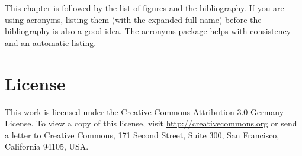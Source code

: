\documentclass[a4paper,twoside, openright,12pt]{report}
\begin{document}
This chapter is followed by the list of figures and the bibliography. If you are using acronyms, listing them (with the expanded full name) before the bibliography is also a good idea. The acronyms package helps with consistency and an automatic listing.




\cleardoublepage
{}
\listoffigures 	 %


\cleardoublepage
{}





\cleardoublepage
\chapter*{License}
This work is licensed under the Creative Commons Attribution 3.0 Germany
License. To view a copy of this license,
visit \href{http://creativecommons.org/licenses/by/3.0/de/}{http://creativecommons.org} or send a letter
to Creative Commons, 171 Second Street, Suite 300, San
Francisco, California 94105, USA.
\end{document}
